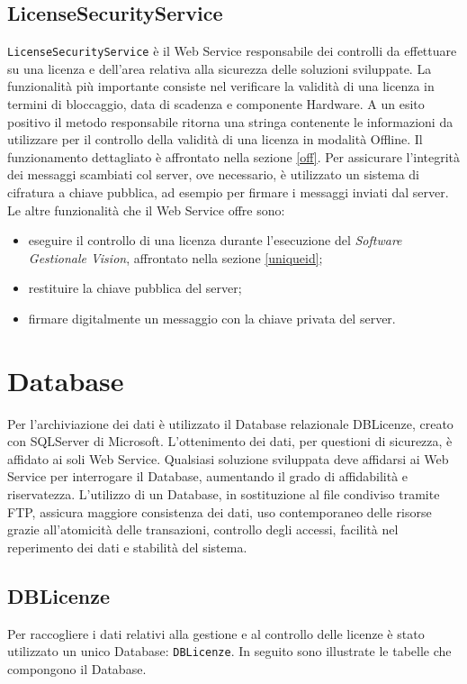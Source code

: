 \subsection{LicenseSecurityService}
\texttt{LicenseSecurityService} è il Web Service responsabile dei controlli da effettuare su una licenza e dell'area relativa alla sicurezza delle soluzioni sviluppate. La funzionalità più importante consiste nel verificare la validità di una licenza in termini di bloccaggio, data di scadenza e componente Hardware. A un esito positivo il metodo responsabile ritorna una stringa contenente le informazioni da utilizzare per il controllo della validità di una licenza in modalità Offline. Il funzionamento dettagliato è affrontato nella sezione \ref{off}.
Per assicurare l'integrità dei messaggi scambiati col server, ove necessario, è utilizzato un sistema di cifratura a chiave pubblica, ad esempio per firmare i messaggi inviati dal server.\\
Le altre funzionalità che il Web Service offre sono:
\begin{itemize}
\item eseguire il controllo di una licenza durante l'esecuzione del \textit{Software Gestionale Vision}, affrontato nella sezione \ref{uniqueid};
\item restituire la chiave pubblica del server;
\item firmare digitalmente un messaggio con la chiave privata del server.

\end{itemize}


\section{Database}
\label{sez:DBLic}
Per l'archiviazione dei dati è utilizzato il Database relazionale DBLicenze, creato con SQLServer di Microsoft. L'ottenimento dei dati, per questioni di sicurezza, è affidato ai soli Web Service. Qualsiasi soluzione sviluppata deve affidarsi ai Web Service per interrogare il Database, aumentando il grado di affidabilità e riservatezza. L'utilizzo di un Database, in sostituzione al file condiviso tramite FTP, assicura maggiore consistenza dei dati, uso contemporaneo delle risorse grazie all'atomicità delle transazioni, controllo degli accessi, facilità nel reperimento dei dati e stabilità del sistema.


\subsection{DBLicenze}
Per raccogliere i dati relativi alla gestione e al controllo delle licenze è stato utilizzato un unico Database: \texttt{DBLicenze}. In seguito sono illustrate le tabelle che compongono il Database.

